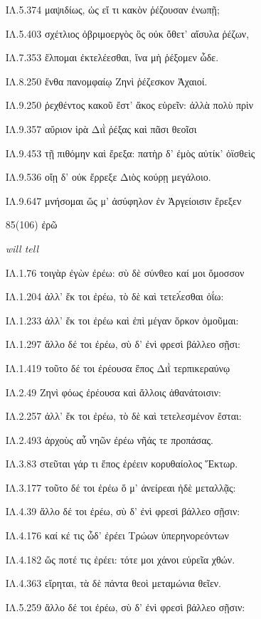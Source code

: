 \begin{enumerate}
{ΙΛ.5.374 μαψιδίως, ὡς εἴ τι κακὸν ῥέζουσαν ἐνωπῇ; 

ΙΛ.5.403 σχέτλιος ὀβριμοεργὸς ὃς οὐκ ὄθετ' αἴσυλα ῥέζων, 

ΙΛ.7.353 ἔλπομαι ἐκτελέεσθαι, ἵνα μὴ ῥέξομεν ὧδε. 

ΙΛ.8.250 ἔνθα πανομφαίῳ Ζηνὶ ῥέζεσκον Ἀχαιοί. 

ΙΛ.9.250 ῥεχθέντος κακοῦ ἔστ' ἄκος εὑρεῖν: ἀλλὰ πολὺ πρὶν 

ΙΛ.9.357 αὔριον ἱρὰ Διῒ ῥέξας καὶ πᾶσι θεοῖσι 

ΙΛ.9.453 τῇ πιθόμην καὶ ἔρεξα: πατὴρ δ' ἐμὸς αὐτίκ' ὀϊσθεὶς 

ΙΛ.9.536 οἴῃ δ' οὐκ ἔρρεξε Διὸς κούρῃ μεγάλοιο. 

ΙΛ.9.647 μνήσομαι ὥς μ' ἀσύφηλον ἐν Ἀργείοισιν ἔρεξεν 

}

\clearpage
\item[\large 85(106)]{\large \g ἐρῶ}

\hspace{0.2cm} \textit{ will tell  }

{\g
ΙΛ.1.76 τοιγὰρ ἐγὼν ἐρέω: σὺ δὲ σύνθεο καί μοι ὄμοσσον 

ΙΛ.1.204 ἀλλ' ἔκ τοι ἐρέω, τὸ δὲ καὶ τετελ́εσθαι ὀΐω: 

ΙΛ.1.233 ἀλλ' ἔκ τοι ἐρέω καὶ ἐπὶ μέγαν ὅρκον ὀμοῦμαι: 

ΙΛ.1.297 ἄλλο δέ τοι ἐρέω, σὺ δ' ἐνὶ φρεσὶ βάλλεο σῇσι: 

ΙΛ.1.419 τοῦτο δέ τοι ἐρέουσα ἔπος Διῒ τερπικεραύνῳ 

ΙΛ.2.49 Ζηνὶ φόως ἐρέουσα καὶ ἄλλοις ἀθανάτοισιν: 

ΙΛ.2.257 ἀλλ' ἔκ τοι ἐρέω, τὸ δὲ καὶ τετελεσμένον ἔσται: 

ΙΛ.2.493 ἀρχοὺς αὖ νηῶν ἐρέω νῆάς τε προπάσας. 

ΙΛ.3.83 στεῦται γάρ τι ἔπος ἐρέειν κορυθαίολος Ἕκτωρ. 

ΙΛ.3.177 τοῦτο δέ τοι ἐρέω ὅ μ' ἀνείρεαι ἠδὲ μεταλλᾷς: 

ΙΛ.4.39 ἄλλο δέ τοι ἐρέω, σὺ δ' ἐνὶ φρεσὶ βάλλεο σῇσιν: 

ΙΛ.4.176 καί κέ τις ὧδ' ἐρέει Τρώων ὑπερηνορεόντων 

ΙΛ.4.182 ὥς ποτέ τις ἐρέει: τότε μοι χάνοι εὐρεῖα χθών. 

ΙΛ.4.363 εἴρηται, τὰ δὲ πάντα θεοὶ μεταμώνια θεῖεν. 

ΙΛ.5.259 ἄλλο δέ τοι ἐρέω, σὺ δ' ἐνὶ φρεσὶ βάλλεο σῇσιν: 

}
\end{enumerate}
